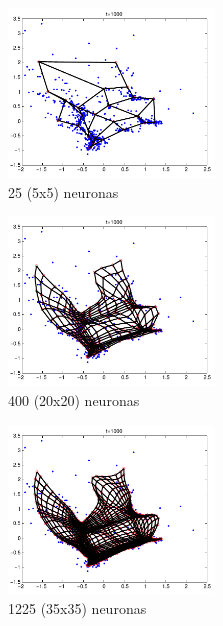 \documentclass[informe.tex]{subfiles}
\begin{document}
      \newpage
      \begin{minipage}{0.30\textwidth}
	\centering
	\begin{figure}[H]
	  \centering
	  \includegraphics[height=4.5cm,keepaspectratio]{graficos/malla/5x5.png}
                \caption{\small 25 (5x5) neuronas}
	\end{figure}
	
	\begin{figure}[H]
	  \centering
	  \includegraphics[height=4.5cm,keepaspectratio]{graficos/malla/20x20.png}
                \caption{\small 400 (20x20) neuronas}
	\end{figure}
	
	\begin{figure}[H]
	  \centering
	  \includegraphics[height=4.5cm,keepaspectratio]{graficos/malla/35x35.png}
                \caption{\small 1225 (35x35) neuronas}
	\end{figure}
      \end{minipage}
\end{document}
